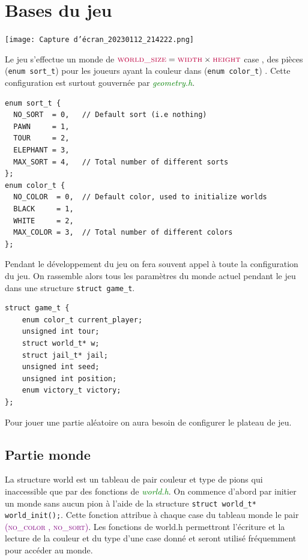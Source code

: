 \documentclass[a4paper]{article}
\begin{document}
\section{Bases du jeu}


\texttt{[image: Capture d'écran\_20230112\_214222.png]}




Le jeu s’effectue un monde de $\textcolor{purple}{\textsc{world\_size}} = \textcolor{purple}{\textsc{width}} \times 
 \textcolor{purple}{\textsc{height}}$  case , des pièces (\lstinline|enum sort_t|) pour les joueurs ayant la couleur 
 dans (\lstinline|enum color_t|) . Cette configuration est surtout gouvernée par \textcolor{green}{\textit{geometry.h}}. \\
\begin{lstlisting}
enum sort_t {
  NO_SORT  = 0,   // Default sort (i.e nothing)
  PAWN     = 1,
  TOUR     = 2,
  ELEPHANT = 3,
  MAX_SORT = 4,   // Total number of different sorts
};
enum color_t {
  NO_COLOR  = 0,  // Default color, used to initialize worlds
  BLACK     = 1,
  WHITE     = 2,
  MAX_COLOR = 3,  // Total number of different colors 
};
\end{lstlisting}

Pendant le développement du jeu on fera souvent appel à toute la configuration du jeu. On rassemble alors tous les paramètres du monde
 actuel pendant le jeu dans une structure \lstinline|struct game_t|.
\begin{lstlisting}
struct game_t {
    enum color_t current_player;
    unsigned int tour;
    struct world_t* w;
    struct jail_t* jail;
    unsigned int seed;
    unsigned int position;
    enum victory_t victory;
};
\end{lstlisting}
Pour jouer une partie aléatoire on aura besoin de configurer le plateau de jeu.
\subsection{Partie monde}
La structure world est un tableau de pair couleur et type de pions qui inaccessible que par des fonctions de 
\textcolor{green}{\textit{world.h}}. On commence d’abord par initier un monde sans aucun pion à l’aide de la structure 
\lstinline|struct world_t* world_init();|. Cette fonction attribue à chaque case du tableau monde le pair 
\textcolor{purple}{\textsc{(no\_color , no\_sort)}}. Les fonctions de world.h permettront l’écriture et la lecture de la couleur et
 du type d’une case donné et seront utilisé fréquemment pour accéder au monde.  
 
\end{document}
